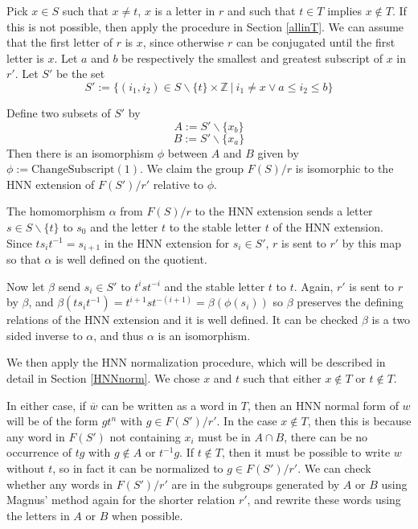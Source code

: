 \documentclass[12pt]{article} %
\theoremstyle{definition}
\theoremstyle{definition}
\theoremstyle{definition}
\theoremstyle{definition}
\theoremstyle{definition}
\theoremstyle{definition}
\begin{document}
Pick $x \in S$ such that $x \ne t$,
  $x$ is a letter in $r$ and such that $t \in T$ implies $x \notin T$.
  If this is not possible, then apply the procedure in Section \ref{allinT}.
  We can assume that the first letter of $r$ is
$x$, since otherwise $r$ can be conjugated until the first letter is $x$.
Let $a$ and $b$ be respectively the
smallest and greatest subscript of $x$ in $r'$. Let $S'$ be the set
\begin{equation}
S' := \{(i_1, i_2) \in S \backslash \{t\} \times \mathbb{Z} \
| \ i_1 \ne x \vee a \le i_2 \le b \}
\end{equation}

Define two subsets of $S'$ by
\begin{equation}
  A := S' \backslash \{x_b\}
\end{equation}
\begin{equation}
  B := S' \backslash \{x_a\}
\end{equation}
Then there is an isomorphism $\phi$ between $A$ and $B$ given by
$\phi := \text{ChangeSubscript}(1)$.
We claim the group $F(S) / r$ is isomorphic to the HNN extension of $F(S') / r'$ relative to $\phi$.

The homomorphism $\alpha$ from $F(S)/r$ to the HNN extension sends a letter
$s \in S \backslash \{t\}$ to $s_0$ and
the letter $t$ to the stable letter $t$ of the HNN extension. Since $t s_i t^{-1} = s_{i+1}$ in
the HNN extension for $s_i \in S'$, $r$ is sent to $r'$ by this map so that $\alpha$ is well defined
on the quotient.

Now let $\beta$ send $s_i \in S'$ to $t^{i} s t^{-i}$ and the stable letter $t$ to $t$.
Again, $r'$ is sent to $r$ by $\beta$, and $\beta (t s_i t^{-1}) = t^{i+1} s t^{-(i+1)} =
\beta (\phi (s_i))$ so $\beta$ preserves the defining relations of the HNN extension and it
is well defined. It can be checked $\beta$ is a two sided inverse to $\alpha$, and thus $\alpha$
is an isomorphism.

We then apply the HNN normalization procedure, which will be described in detail in Section
\ref{HNNnorm}. We chose $x$ and $t$ such that either $x \notin T$ or $t \notin T$.

In either case, if $\overline{w}$ can be written as a word in $T$,
then an HNN normal form of $w$ will be of the form $g t^n$
with $g \in F(S') / r'$. In the case $x \notin T$, then this is because any word in
$F(S')$ not containing $x_i$ must be in $A \cap B$, there can be no occurrence of
$tg$ with $g \notin A$ or $t^{-1}g.$
If $t \notin T$, then it must be possible to write $w$ without $t$, so in fact it can be normalized
to $g \in F(S') / r'$. We can check whether any words in $F(S') / r'$ are in the subgroups
generated by $A$ or $B$ using
Magnus' method again for the shorter relation $r'$, and rewrite these words using the letters
in $A$ or $B$ when possible.
\end{document}
